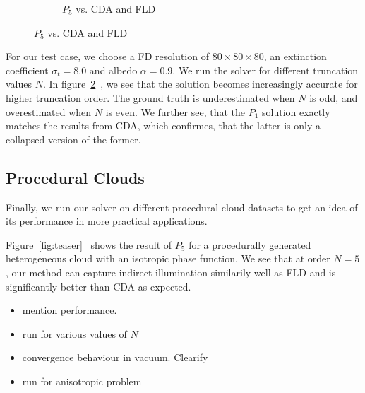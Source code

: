 \begin{figure}[h]
\begin{subfigure}{0.45\columnwidth}
\caption{$P_5$ vs. CDA and FLD}
\label{fig:pointsource_p5}
\end{subfigure}%
\vspace{-0.1in}
\label{fig:pointsource}
\end{figure}

For our test case, we choose a FD resolution of $80\times80\times80$, an extinction coefficient $\sigma_t=8.0$ and albedo $\alpha=0.9$. We run the solver for different truncation values $N$. In figure~\ref{fig:pointsource}~, we see that the solution becomes increasingly accurate for higher truncation order. The ground truth is underestimated when $N$ is odd, and overestimated when $N$ is even. We further see, that the $P_1$ solution exactly matches the results from CDA, which confirmes, that the latter is only a collapsed version of the former.

\subsection{Procedural Clouds}

Finally, we run our solver on different procedural cloud datasets to get an idea of its performance in more practical applications.

Figure~\ref{fig:teaser}~ shows the result of $P_5$ for a procedurally generated heterogeneous cloud with an isotropic phase function. We see that at order $N=5$, our method can capture indirect illumination similarily well as FLD and is significantly better than CDA as expected.

\begin{itemize}
	\item mention performance.
	\item run for various values of $N$
	\item convergence behaviour in vacuum. Clearify
	\item run for anisotropic problem
\end{itemize}


